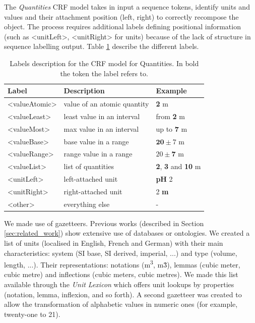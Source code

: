 \documentclass[sigconf]{acmart}
\begin{document}
The \textit{Quantities} CRF model takes in input a sequence tokens, identify units and values and their attachment position (left, right) to correctly recompose the object. The process requires additional labels defining positional information (such as <unitLeft>, <unitRight> for units) because of the lack of structure in sequence labelling output. Table \ref{tab:quantities-model-labels} describe the different labels.

\begin{table}[ht]
  \caption{Labels description for the CRF model for Quantities. In bold the token the label refers to.}
  \label{tab:quantities-model-labels}
  \begin{tabular}{lll}
    \toprule
    Label & Description & Example\\
    \midrule
    <valueAtomic> & value of an atomic quantity & \textbf{2} m \\
    <valueLeast> & least value in an interval & from \textbf{2} m \\
    <valueMost> & max value in an interval & up to \textbf{7} m \\
    <valueBase> & base value in a range & $\textbf{20}\pm7$ m \\
    <valueRange> & range value in a range & $20 \pm \textbf{7}$ m \\
    <valueList> & list of quantities & \textbf{2}, \textbf{3} and \textbf{10} m \\
    <unitLeft> & left-attached unit & \textbf{pH} 2 \\
    <unitRight> & right-attached unit & 2 \textbf{m} \\
    <other> & everything else & - \\
  \bottomrule
\end{tabular}
\end{table}

We made use of gazetteers. Previous works (described in Section \ref{sec:related_work}) show extensive use of databases or ontologies. We created a list of units (localised in English, French and German) with their main characteristics: system (SI base, SI derived, imperial, ...) and type (volume, length, ...). Their representations: notations (m\textsuperscript{3}, m\^3), lemmas (cubic meter, cubic metre) and inflections (cubic meters, cubic metres).  We made this list available through the \textit{Unit Lexicon} which offers unit lookups by properties (notation, lemma, inflexion, and so forth). A second gazetteer was created to allow the transformation of alphabetic values in numeric ones (for example, twenty-one to 21).
\end{document}
